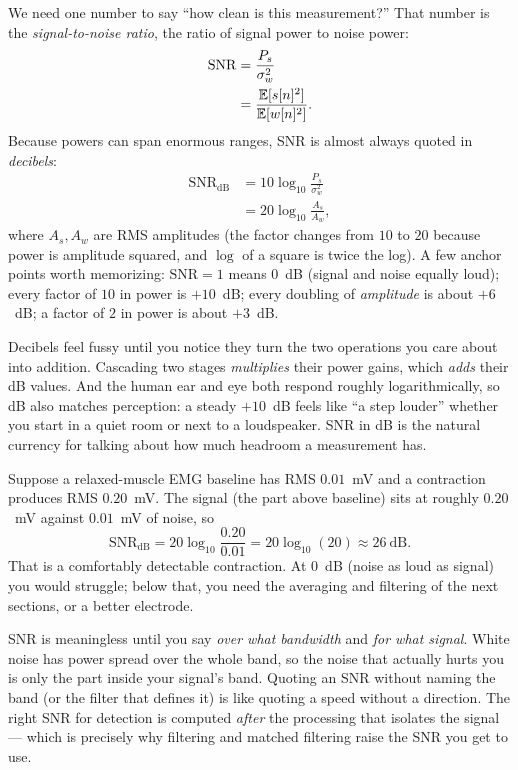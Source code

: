We need one number to say ``how clean is this measurement?'' That number is the
\emph{signal-to-noise ratio}, the ratio of signal power to noise power:
\begin{align}
  \mathrm{SNR} &= \frac{P_s}{\sigma_w^2} \nonumber \\
  &= \frac{\operatorname{\mathbb{E}}[s[n]^2]}{\operatorname{\mathbb{E}}[w[n]^2]}.
  \label{ch20:snr-def}
\end{align}
Because powers can span enormous ranges, SNR is almost always quoted in
\emph{decibels}:
\begin{align}
  \mathrm{SNR_{dB}} &= 10\log_{10}\frac{P_s}{\sigma_w^2} \nonumber \\
  &= 20\log_{10}\frac{A_s}{A_w},
  \label{ch20:snr-db}
\end{align}
where $A_s, A_w$ are RMS amplitudes (the factor changes from $10$ to $20$ because
power is amplitude squared, and $\log$ of a square is twice the log). A few
anchor points worth memorizing: $\mathrm{SNR}=1$ means $0$~dB (signal and noise
equally loud); every factor of $10$ in power is $+10$~dB; every doubling of
\emph{amplitude} is about $+6$~dB; a factor of $2$ in power is about $+3$~dB.

\begin{intuitionbox}
Decibels feel fussy until you notice they turn the two operations you care about
into addition. Cascading two stages \emph{multiplies} their power gains, which
\emph{adds} their dB values. And the human ear and eye both respond roughly
logarithmically, so dB also matches perception: a steady $+10$~dB feels like ``a
step louder'' whether you start in a quiet room or next to a loudspeaker. SNR in dB is the
natural currency for talking about how much headroom a measurement has.
\end{intuitionbox}

\begin{example}
\label{ch20:ex-snr-read}
Suppose a relaxed-muscle EMG baseline has RMS $0.01$~mV and a contraction
produces RMS $0.20$~mV. The signal (the part above baseline) sits at roughly
$0.20$~mV against $0.01$~mV of noise, so
\[
  \mathrm{SNR_{dB}} = 20\log_{10}\frac{0.20}{0.01} = 20\log_{10}(20) \approx 26\ \text{dB}.
\]
That is a comfortably detectable contraction. At $0$~dB (noise as loud as
signal) you would struggle; below that, you need the averaging and filtering of
the next sections, or a better electrode.
\end{example}

\begin{trapbox}
SNR is meaningless until you say \emph{over what bandwidth} and \emph{for what
signal}. White noise has power spread over the whole band, so the noise that
actually hurts you is only the part inside your signal's band. Quoting an SNR
without naming the band (or the filter that defines it) is like quoting a speed
without a direction. The right SNR for detection is computed \emph{after} the
processing that isolates the signal --- which is precisely why filtering and
matched filtering raise the SNR you get to use.
\end{trapbox}

